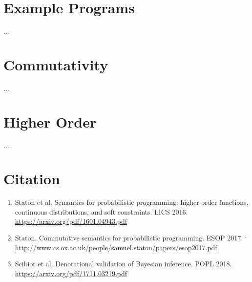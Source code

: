 \documentclass[11pt]{article}
\theoremstyle{definition}
\theoremstyle{plain}
\begin{document}
\section{Example Programs}

\noindent ...

\section{Commutativity}

\noindent ...

\section{Higher Order}

\noindent ...

\section{Citation}

\begin{enumerate}
  \item Staton et al. Semantics for probabilistic programming: higher-order
        functions, continuous distributions, and soft constraints. LICS 2016.
        \url{https://arxiv.org/pdf/1601.04943.pdf}

  \item Staton. Commutative semantics for probabilistic programming. ESOP 2017.
`        \url{http://www.cs.ox.ac.uk/people/samuel.staton/papers/esop2017.pdf}

  \item Scibior et al. Denotational validation of Bayesian inference. POPL 2018.
        \url{https://arxiv.org/pdf/1711.03219.pdf}

\end{enumerate}

\end{document}
